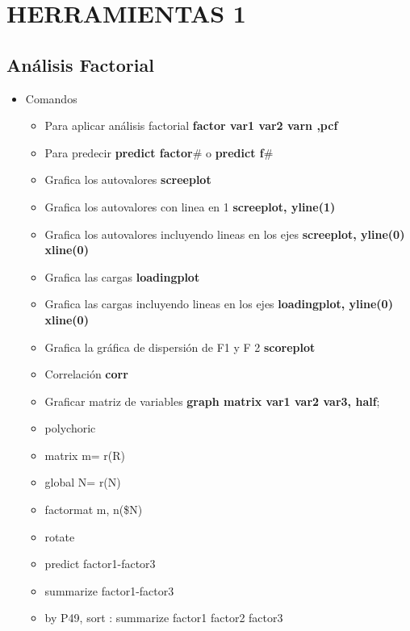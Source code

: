 \section{HERRAMIENTAS 1}

\subsection{Análisis Factorial}

\begin{itemize}
	\item Comandos 
	\begin{itemize}
		\item Para aplicar análisis factorial \textbf{factor var1 var2 varn ,pcf}
		\item Para predecir \textbf{predict factor$\#$} o \textbf{predict f$\#$}
		\item Grafica los autovalores \textbf{screeplot}
		\item Grafica los autovalores con linea en 1 \textbf{screeplot, yline(1)}
		\item Grafica los autovalores incluyendo lineas en los ejes \textbf{screeplot, yline(0) xline(0)}
		\item Grafica las cargas \textbf{loadingplot}
		\item Grafica las cargas incluyendo lineas en los ejes \textbf{loadingplot, yline(0) xline(0)}
		\item Grafica la gráfica de dispersión de F1 y F 2 \textbf{scoreplot}
		\item Correlación \textbf{corr}
		\item Graficar matriz de variables \textbf{graph matrix var1 var2 var3, half};
	\end{itemize}
	
	\begin{itemize}
		\item polychoric 
		\item matrix m= r(R)
		\item global N= r(N)
		\item factormat m, n(\$N)
		\item rotate
		\item predict factor1-factor3
		\item summarize factor1-factor3
		\item by P49, sort : summarize factor1 factor2 factor3
	\end{itemize}
	

\end{itemize}
